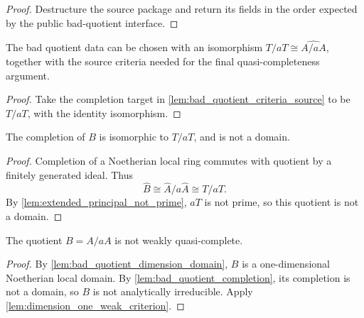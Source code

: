 \begin{proof}
  Destructure the source package and return its fields in the order expected by
  the public bad-quotient interface.
\end{proof}

\begin{lemma}
  \label{lem:bad_quotient_completion_source}
  The bad quotient data can be chosen with an isomorphism
  \(T/aT\cong\widehat{A/aA}\), together with the source criteria needed for
  the final quasi-completeness argument.
\end{lemma}

\begin{proof}
  Take the completion target in
  \cref{lem:bad_quotient_criteria_source} to be \(T/aT\), with the identity
  isomorphism.
\end{proof}

\begin{lemma}
  \label{lem:bad_quotient_completion}
  The completion of \(B\) is isomorphic to \(T/aT\), and is not a domain.
\end{lemma}

\begin{proof}
  Completion of a Noetherian local ring commutes with quotient by a finitely
  generated ideal.  Thus
  \[
    \widehat B\cong\widehat A/a\widehat A\cong T/aT.
  \]
  By \cref{lem:extended_principal_not_prime}, \(aT\) is not prime, so this
  quotient is not a domain.
\end{proof}

\begin{lemma}
  \label{lem:bad_quotient_not_weak}
  The quotient \(B=A/aA\) is not weakly quasi-complete.
\end{lemma}

\begin{proof}
  By \cref{lem:bad_quotient_dimension_domain}, \(B\) is a one-dimensional
  Noetherian local domain.  By \cref{lem:bad_quotient_completion}, its
  completion is not a domain, so \(B\) is not analytically irreducible.
  Apply \cref{lem:dimension_one_weak_criterion}.
\end{proof}

